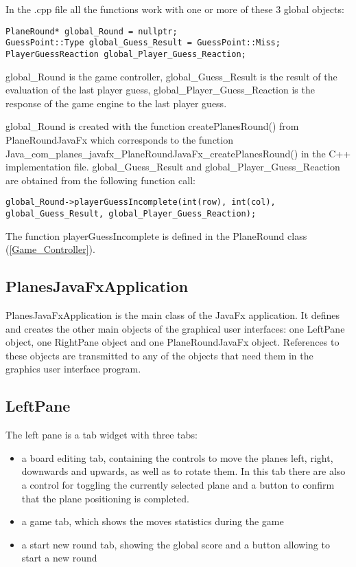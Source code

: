 In the .cpp file all the functions work with one or more of these 3 global objects:

\begin{lstlisting}
PlaneRound* global_Round = nullptr;
GuessPoint::Type global_Guess_Result = GuessPoint::Miss;
PlayerGuessReaction global_Player_Guess_Reaction;
\end{lstlisting}

global\_Round is the game controller, global\_Guess\_Result is the result of the evaluation of the last player guess, global\_Player\_Guess\_Reaction is the response of the game engine to the last player guess. 

global\_Round is created with the function createPlanesRound() from PlaneRoundJavaFx which corresponds to the function\\ Java\_com\_planes\_javafx\_PlaneRoundJavaFx\_createPlanesRound() in the C++ implementation file. global\_Guess\_Result and global\_Player\_Guess\_Reaction are obtained from the following function call:

\begin{lstlisting}
global_Round->playerGuessIncomplete(int(row), int(col), global_Guess_Result, global_Player_Guess_Reaction);
\end{lstlisting}

The function playerGuessIncomplete is defined in the PlaneRound class (\ref{Game_Controller}).

\subsection{PlanesJavaFxApplication}

PlanesJavaFxApplication is the main class of the JavaFx application. It defines and creates the other main objects of the graphical user interfaces: one LeftPane object, one RightPane object and one PlaneRoundJavaFx object. References to these objects are transmitted to any of the objects that need them in the graphics user interface program.  

\subsection{LeftPane}

The left pane is a tab widget with three tabs:

\begin{itemize}
	\item a board editing tab, containing the controls to move the planes left, right, downwards and upwards, as well as to rotate them. In this tab there are also a control for toggling the currently selected plane and a button to confirm that the plane positioning is completed.
	\item a game tab, which shows the moves statistics during the game
	\item a start new round tab, showing the global score and a button allowing to start a new round
\end{itemize}

